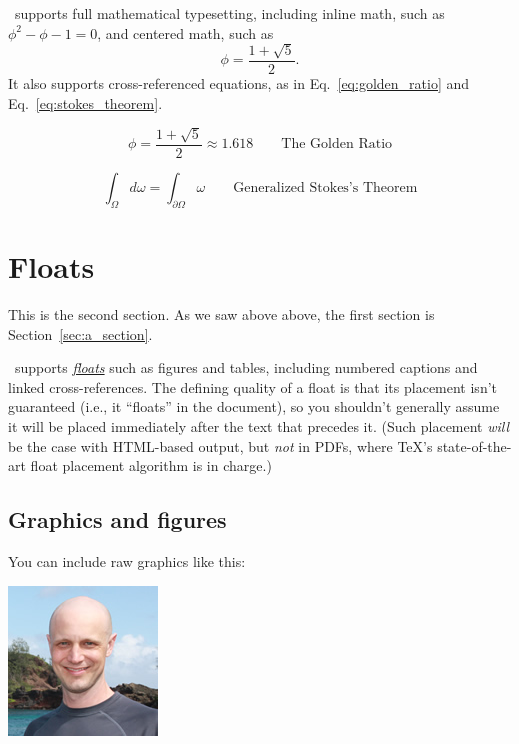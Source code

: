 \PolyTeXnic\ supports full mathematical typesetting, including inline math, such as $\phi^2 - \phi - 1 = 0$, and centered math, such as
\[ \phi = \frac{1+\sqrt{5}}{2}. \]
It also supports cross-referenced equations, as in Eq.~\eqref{eq:golden_ratio} and Eq.~\eqref{eq:stokes_theorem}.

\begin{equation}
\label{eq:golden_ratio}
\phi = \frac{1+\sqrt{5}}{2} \approx 1.618 \qquad{\text{The Golden Ratio}}
\end{equation}

\begin{equation}
\label{eq:stokes_theorem}
\int_\Omega d\omega = \int_{\partial\Omega} \omega \qquad{\text{Generalized Stokes's Theorem}}
\end{equation}

\section{Floats}
\label{sec:floats}

This is the second section. As we saw above above, the first section is Section~\ref{sec:a_section}.

\PolyTeXnic\ supports \href{http://en.wikibooks.org/wiki/LaTeX/Floats,_Figures_and_Captions}{\emph{floats}} such as figures and tables, including numbered captions and linked cross-references. The defining quality of a float is that its placement isn't guaranteed (i.e., it ``floats'' in the document), so you shouldn't generally assume it will be placed immediately after the text that precedes it. (Such placement \emph{will} be the case with HTML-based output, but \emph{not} in PDFs, where \TeX's state-of-the-art float placement algorithm is in charge.)

\subsection{Graphics and figures}
\label{sec:graphics_and_figures}

You can include raw graphics like this:

\includegraphics{images/2011_michael_hartl.png}

